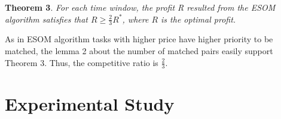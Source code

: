\documentclass[color,twoside,amssymb,twocolumn]{article}
\begin{document}
\textbf{Theorem 3}. {\it For each time window, the profit R resulted from the ESOM algorithm satisfies that $R \geq \frac{2}{3}R^*$, where $R$ is the optimal profit.}

As in ESOM algorithm tasks with higher price have higher priority to be matched, the lemma 2 about the number of matched pairs easily support Theorem 3. Thus, the competitive ratio is $\frac{2}{3}$.

\section{Experimental Study}


\begin{figure}[htb]
	\centering
	\hspace{1in}
	~~	
\end{figure}
\end{document}
